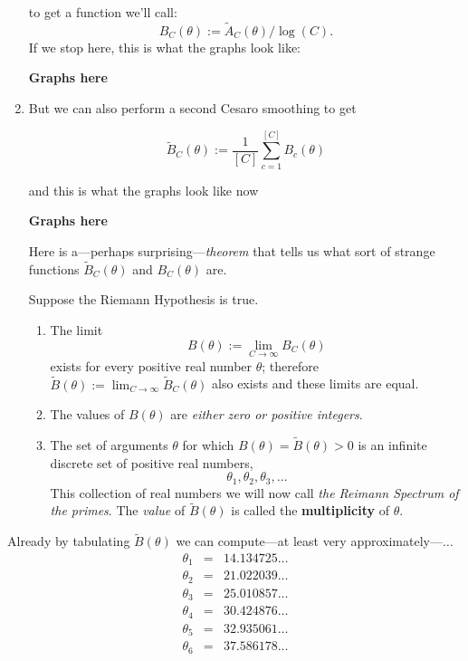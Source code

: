 \documentclass[openany]{book}
\theoremstyle{plain}
\theoremstyle{definition}
\begin{document}
\begin{enumerate}
 to get a function we'll call: $$B_C(\theta):= {\tilde
   A}_C(\theta)/\log(C).$$ If we stop here, this is what the graphs
 look like: \vskip20pt \centerline{\bf Graphs here}
 
  \vskip20pt
\item But we can also perform a second Cesaro smoothing to get

$${\tilde B}_C(\theta):=  {\frac{1}{[C]}}\sum_{c=1}^{[C]} B_c(\theta)$$ 

and this is what the graphs look like now
 \vskip20pt
 \centerline{\bf Graphs here}
 
  \vskip20pt
 Here is a---perhaps surprising---{\it theorem}  that tells us what sort of strange functions ${\tilde B}_C(\theta)$ and $B_C(\theta)$ are.
 
  Suppose the Riemann Hypothesis is
 true. \begin{enumerate}\item The limit $$B(\theta):=\lim_{C \to
     \infty} B_C(\theta)$$ exists for every positive real number
   $\theta$; therefore ${\tilde B}(\theta):={\lim_{C \to
       \infty}}{\tilde B}_C(\theta)$ also exists and these limits are
   equal. \item The values of $B(\theta)$ are {\it either zero or
     positive integers}. \item The set of arguments $\theta$ for which
   $B(\theta) = {\tilde B}(\theta) > 0$ is an infinite discrete set of
   positive real numbers, $$\theta_1,\theta_2,\theta_3,\dots$$ This
   collection of real numbers we will now call {\it the Reimann
     Spectrum of the primes}. The {\it value} of ${\tilde B}(\theta)$
   is called the {\bf multiplicity} of $\theta$.
 \end{enumerate}

\end{enumerate}


   \vskip20pt
   






Already by tabulating  ${\tilde B}(\theta)$ we can compute---at least very approximately---$\dots$
\begin{eqnarray*}
\theta_1 &=& 14.134725 \dots\\
\theta_2 &=& 21.022039 \dots\\
\theta_3 &=& 25.010857 \dots\\
\theta_4 &=& 30.424876 \dots\\
\theta_5 &=& 32.935061 \dots\\
\theta_6 &=& 37.586178 \dots
\end{eqnarray*}
\end{document}
